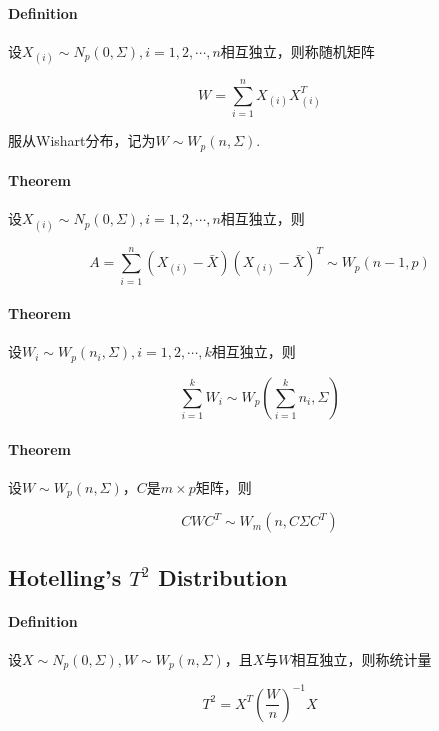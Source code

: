 \documentclass[a4paper,11pt]{article}
\begin{document}
\paragraph{Definition}
设$X_{(i)}\sim N_p(0, \Sigma), i=1,2,\cdots, n$相互独立，则称随机矩阵

\begin{displaymath}
W = \sum_{i=1}^n X_{(i)}X_{(i)}^T
\end{displaymath}

服从Wishart分布，记为$W\sim W_p(n, \Sigma)$. 

\paragraph{Theorem}
设$X_{(i)}\sim N_p(0, \Sigma), i=1,2,\cdots, n$相互独立，则

\begin{displaymath}
A =\sum_{i=1}^n (X_{(i)}-\bar{X})(X_{(i)} - \bar{X})^T\sim W_p(n-1, p)
\end{displaymath}

\paragraph{Theorem}
设$W_i\sim W_p(n_i, \Sigma), i=1,2,\cdots, k$相互独立，则

\begin{displaymath}
\sum_{i=1}^k W_i \sim W_p(\sum_{i=1}^kn_i, \Sigma)
\end{displaymath}

\paragraph{Theorem}
设$W\sim W_p(n, \Sigma)$，$C$是$m\times p$矩阵，则

\begin{displaymath}
CWC^T \sim W_m(n, C\Sigma C^T)
\end{displaymath}

\subsection{Hotelling's $T^2$ Distribution}
\paragraph{Definition} 
设$X\sim N_p(0, \Sigma), W\sim W_p(n, \Sigma)$，且$X$与$W$相互独立，则称统计量

\begin{displaymath}
T^2 = X^T(\frac{W}{n})^{-1}X
\end{displaymath}
\end{document}
